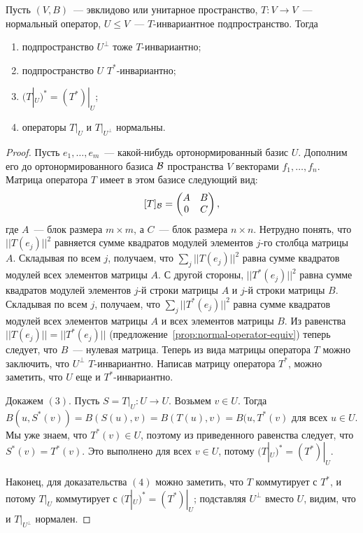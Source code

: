 \begin{proposition}\label{prop:normal-operator-invariant-subspaces}
Пусть $(V,B)$~--- эвклидово или унитарное пространство,
$T\colon V\to V$~--- нормальный оператор, $U\leq V$~---
$T$-инвариантное подпространство. Тогда
\begin{enumerate}
\item подпространство $U^\perp$ тоже $T$-инвариантно;
\item подпространство $U$ $T^*$-инвариантно;
\item $(T|_U)^* = (T^*)|_U$;
\item операторы $T|_U$ и $T|_{U^\perp}$ нормальны.
\end{enumerate}
\end{proposition}
\begin{proof}
Пусть $e_1,\dots,e_m$~--- какой-нибудь ортонормированный базис
$U$. Дополним его до ортонормированного базиса $\mathcal B$ пространства
$V$ векторами $f_1,\dots,f_n$. Матрица оператора $T$ имеет в этом
базисе следующий вид:
$$
[T]_{\mathcal B} = \begin{pmatrix} A & B \\ 0 & C\end{pmatrix},
$$
где $A$~--- блок размера $m\times m$, а $C$~--- блок размера
$n\times n$.
Нетрудно понять, что $||T(e_j)||^2$ равняется сумме квадратов модулей
элементов $j$-го столбца матрицы $A$. Складывая по всем $j$,
получаем, что $\sum_j||T(e_j)||^2$ равна сумме квадратов модулей всех
элементов матрицы $A$.
С другой стороны, $||T^*(e_j)||^2$ равна сумме квадратов модулей
элементов $j$-й строки матрицы $A$ и $j$-й строки матрицы $B$.
Складывая по всем $j$, получаем, что $\sum_j||T^*(e_j)||^2$ равна
сумме квадратов модулей всех элементов матрицы $A$ и всех элементов
матрицы $B$.
Из равенства $||T(e_j)|| = ||T^*(e_j)||$
(предложение~\ref{prop:normal-operator-equiv}) теперь следует,
что $B$~--- нулевая матрица. Теперь из вида матрицы оператора $T$
можно заключить, что $U^\perp$ $T$-инвариантно. Написав матрицу
оператора $T^*$, можно заметить, что $U$ еще и $T^*$-инвариантно.

Докажем $(3)$. Пусть $S = T|_U\colon U\to U$. Возьмем $v\in U$.
Тогда $B(u,S^*(v)) = B(S(u),v) = B(T(u),v) = B(u,T^*(v)$ для всех
$u\in U$. Мы уже знаем, что $T^*(v)\in U$, поэтому из приведенного
равенства следует, что $S^*(v) = T^*(v)$.
Это выполнено для всех $v\in U$, потому
$(T|_U)^* = (T^*)|_U$.

Наконец, для доказательства $(4)$ можно заметить, что $T$ коммутирует
с $T^*$, и потому $T|_U$ коммутирует с $(T|_U)^* = (T^*)|_U$;
подставляя $U^\perp$ вместо $U$, видим, что и
$T|_{U^\perp}$ нормален.
\end{proof}

